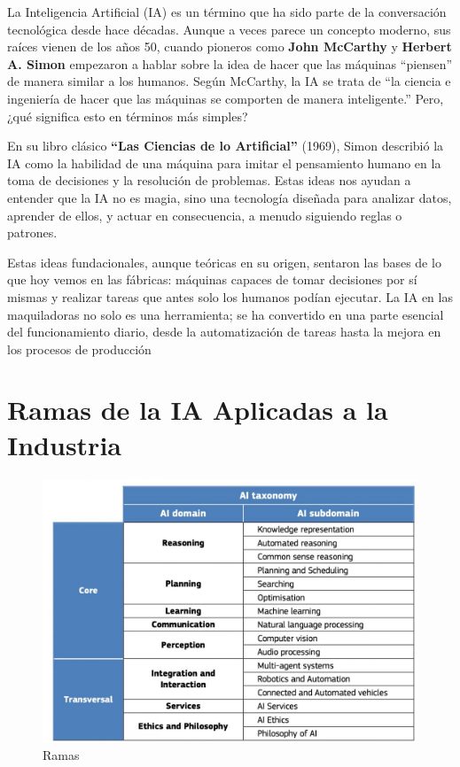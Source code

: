 \documentclass[
  10pt,
  letterpaper,
]{book}
\begin{document}
La Inteligencia Artificial (IA) es un término que ha sido parte de la
conversación tecnológica desde hace décadas. Aunque a veces parece un
concepto moderno, sus raíces vienen de los años 50, cuando pioneros como
\textbf{John McCarthy} y \textbf{Herbert A. Simon} empezaron a hablar
sobre la idea de hacer que las máquinas ``piensen'' de manera similar a
los humanos. Según McCarthy, la IA se trata de ``la ciencia e ingeniería
de hacer que las máquinas se comporten de manera inteligente.'' Pero,
¿qué significa esto en términos más simples?

En su libro clásico \textbf{``Las Ciencias de lo Artificial''} (1969),
Simon describió la IA como la habilidad de una máquina para imitar el
pensamiento humano en la toma de decisiones y la resolución de
problemas. Estas ideas nos ayudan a entender que la IA no es magia, sino
una tecnología diseñada para analizar datos, aprender de ellos, y actuar
en consecuencia, a menudo siguiendo reglas o patrones.

Estas ideas fundacionales, aunque teóricas en su origen, sentaron las
bases de lo que hoy vemos en las fábricas: máquinas capaces de tomar
decisiones por sí mismas y realizar tareas que antes solo los humanos
podían ejecutar. La IA en las maquiladoras no solo es una herramienta;
se ha convertido en una parte esencial del funcionamiento diario, desde
la automatización de tareas hasta la mejora en los procesos de
producción

\section{Ramas de la IA Aplicadas a la
Industria}\label{ramas-de-la-ia-aplicadas-a-la-industria}

\begin{figure}[H]

{\centering \includegraphics{Img/taxonomia.jpg}

}

\caption{Ramas}

\end{figure}%
\end{document}

